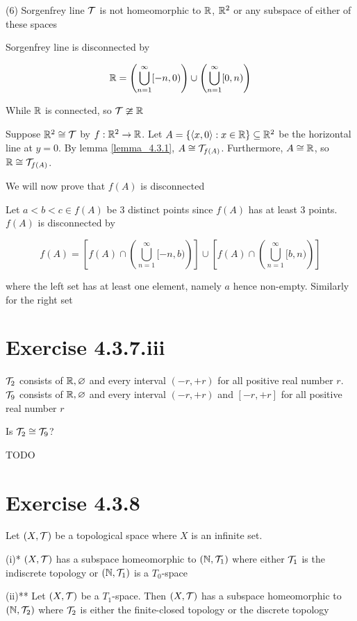 \documentclass{article}
\begin{document}
(6) Sorgenfrey line $\mathcal{T}$ is not homeomorphic to $\mathbb{R}$, $\mathbb{R}^2$ or any subspace of either of these spaces

Sorgenfrey line is disconnected by 

$$
    \mathbb{R} = \left( \bigcup_{n = 1}^\infty [-n, 0) \right) \cup \left( \bigcup_{n = 1}^\infty [0, n) \right)
$$

While $\mathbb{R}$ is connected, so $\mathcal{T} \ncong \mathbb{R}$

Suppose $\mathbb{R}^2 \cong \mathcal{T}$ by $f: \mathbb{R}^2 \to \mathbb{R}$. Let $A = \{ \langle x, 0 \rangle: x \in \mathbb{R} \} \subseteq \mathbb{R}^2$ be the horizontal line at $y = 0$. By lemma \ref{lemma_4.3.1}, $A \cong \mathcal{T}_{f(A)}$. Furthermore, $A \cong \mathbb{R}$, so $\mathbb{R} \cong \mathcal{T}_{f(A)}$.

We will now prove that $f(A)$ is disconnected

Let $a < b < c \in f(A)$ be 3 distinct points since $f(A)$ has at least 3 points. $f(A)$ is disconnected by

$$
    f(A) = \left[f(A) \cap \left( \bigcup_{n = 1}^\infty [-n, b) \right)\right] \cup \left[f(A) \cap \left( \bigcup_{n = 1}^\infty [b, n) \right)\right]
$$

where the left set has at least one element, namely $a$ hence non-empty. Similarly for the right set

\section*{Exercise 4.3.7.iii}

$\mathcal{T}_2$ consists of $\mathbb{R}, \varnothing$ and every interval $(-r, +r)$ for all positive real number $r$. $\mathcal{T}_9$ consists of $\mathbb{R}, \varnothing$ and every interval $(-r, +r)$ and $[-r, +r]$ for all positive real number $r$

Is $\mathcal{T}_2 \cong \mathcal{T}_9$?


TODO

\section*{Exercise 4.3.8}

Let $(X, \mathcal{T})$ be a topological space where $X$ is an infinite set.


    (i)* $(X, \mathcal{T})$ has a subspace homeomorphic to $(\mathbb{N}, \mathcal{T}_1)$ where either $\mathcal{T}_1$ is the indiscrete topology or $(\mathbb{N}, \mathcal{T}_1)$ is a $T_0$-space
    
    (ii)** Let $(X, \mathcal{T})$ be a $T_1$-space. Then $(X, \mathcal{T})$ has a subspace homeomorphic to $(\mathbb{N}, \mathcal{T}_2)$ where $\mathcal{T}_2$ is either the finite-closed topology or the discrete topology
    
\end{document}
